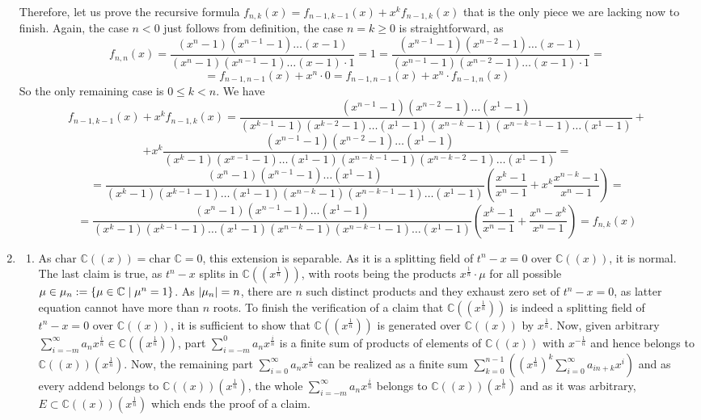 \documentclass[8pt]{article} %
\begin{document}
\begin{enumerate}[label=\bfseries Problem \arabic*.]
{\begin{enumerate}[label=(\arabic*).]
{				\renewcommand{\x}[1]{(x^{#1}-1)}
				Therefore, let us prove the recursive formula $f_{n,k}(x)=f_{n-1,k-1}(x)+x^kf_{n-1,k}(x)$ that is the only piece
				we are lacking now to finish. Again, the case $n<0$ just follows from definition, the case $n=k\geq 0$ is straightforward, as
				\[f_{n,n}(x)=\frac{(x^n-1)(x^{n-1}-1)\dots(x-1)}{(x^n-1)(x^{n-1}-1)\dots(x-1)\cdot1}=1=
				\frac{(x^{n-1}-1)(x^{n-2}-1)\dots(x-1)}{(x^{n-1}-1)(x^{n-2}-1)\dots(x-1)\cdot1}=\]\[=f_{n-1,n-1}(x)+x^n\cdot 0
				=f_{n-1,n-1}(x)+x^n\cdot f_{n-1,n}(x)\]
				So the only remaining case is $0\leq k<n$. We have
				\[f_{n-1,k-1}(x)+x^kf_{n-1,k}(x)=\frac{\x{n-1}\x{n-2}\dots\x{1}}{\x{k-1}\x{k-2}\dots\x{1}\x{n-k}\x{n-k-1}\dots\x{1}}+\]
				\[+x^k\frac{\x{n-1}\x{n-2}\dots\x{1}}{\x{k}\x{x-1}\dots\x{1}\x{n-k-1}\x{n-k-2}\dots\x{1}}=\]
				\[=\frac{\x{n}\x{n-1}\dots\x{1}}{\x{k}\x{k-1}\dots\x{1}\x{n-k}\x{n-k-1}\dots\x{1}}\left(\frac{x^k-1}{x^n-1}+x^k\frac{x^{n-k}-1}{x^n-1}
				\right)=\]
				\[=\frac{\x{n}\x{n-1}\dots\x{1}}{\x{k}\x{k-1}\dots\x{1}\x{n-k}\x{n-k-1}\dots\x{1}}\left(\frac{x^k-1}{x^n-1}+\frac{x^n-x^k}{x^n-1}
				\right)=f_{n,k}(x)\]
				}
		\end{enumerate}
		}
	\item{
		\begin{enumerate}[label=(\arabic*).]
			\newcommand{\E}{\mathbb{C}((x^{\frac{1}{n}}))}
			\newcommand{\F}{\mathbb{C}((x))}
			\item{As $\mbox{char }\mathbb{C}((x))=\mbox{char }\mathbb{C}=0$, this extension is separable. As it is a splitting field of $t^n-x=0$ over
				$\mathbb{C}((x))$, it is normal. The last claim is true, as $t^n-x$ splits in $\mathbb{C}((x^{\frac{1}{n}}))$, with roots
				being the products $x^{\frac{1}{n}}\cdot\mu$ for all possible $\mu\in\mu_n:=\left\{\mu\in\mathbb{C}\mid \mu^n=1\right\}$. As
				$\left|\mu_n\right|=n$, there are $n$ such distinct products and they exhaust zero set of $t^n-x=0$, as latter equation cannot
				have more than $n$ roots. To finish the verification of a claim that $\mathbb{C}((x^{\frac{1}{n}}))$ is indeed a splitting field
				of $t^n-x=0$ over $\mathbb{C}((x))$, it is sufficient to show that $\E$ is generated over $\F$ by $x^{\frac{1}{n}}$.
				Now, given arbitrary $\sum_{i=-m}^{\infty}a_nx^{\frac{i}{n}}\in\E$, part $\sum_{i=-m}^0a_nx^{\frac{i}{n}}$ is a finite sum
				of products of elements of $\F$ with $x^{-\frac{1}{n}}$ and hence belongs to $\F(x^{\frac{1}{n}})$. Now, the remaining
				part $\sum_{i=0}^\infty a_nx^{\frac{i}{n}}$ can be realized as a finite sum
				$\sum_{k=0}^{n-1}\left((x^{\frac{1}{n}})^k\sum_{i=0}^\infty a_{in+k}x^i\right)$ and as every addend belongs to
				$\F(x^{\frac{1}{n}})$, the whole $\sum_{i=-m}^{\infty}a_nx^{\frac{i}{n}}$ belongs to $\F(x^{\frac{1}{n}})$ and as it was
				arbitrary, $E\subset\F(x^{\frac{1}{n}})$ which ends the proof of a claim.

}
\end{enumerate}}
\end{enumerate}
\end{document}
